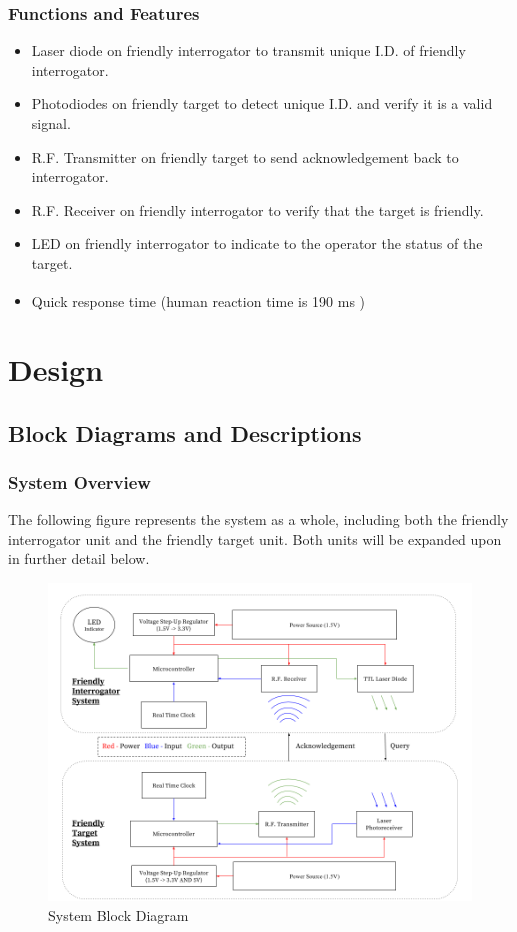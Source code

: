 \documentclass[letterpaper,10pt]{article}
\begin{document}
\begin{spacing}{1.15}
\subsubsection{Functions and Features}
\begin{itemize}
	\item Laser diode on friendly interrogator to transmit unique I.D. of friendly interrogator.
	\item Photodiodes on friendly target to detect unique I.D. and verify it is a valid signal.
	\item R.F. Transmitter on friendly target to send acknowledgement back to interrogator.
	\item R.F. Receiver on friendly interrogator to verify that the target is friendly.
	\item LED on friendly interrogator to indicate to the operator the status of the target.
	\item Quick response time (human reaction time is 190 ms \textsuperscript{\cite{Reaction_Times}})
\end{itemize}
\clearpage

\section{Design}
\subsection{Block Diagrams and Descriptions}
\subsubsection{System Overview}
The following figure represents the system as a whole, including both the friendly interrogator unit and the friendly target unit. Both units will be expanded upon in further detail below.
\begin{figure} [H]
	\centering
	\includegraphics[scale=0.45]{System_Block_Diagram.png}
	\caption{System Block Diagram\label{fig:system-block-diagram}}
\end{figure}


\end{spacing}
\end{document}
